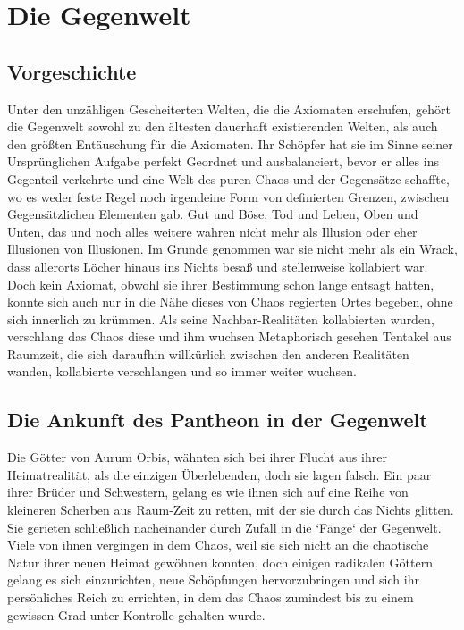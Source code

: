 \documentclass[a4paper,12pt,oneside]{book}
\begin{document}
\section{Die Gegenwelt}
\subsection{Vorgeschichte}
Unter den unzähligen Gescheiterten Welten, die die Axiomaten erschufen, gehört die Gegenwelt sowohl zu den ältesten dauerhaft existierenden Welten, als auch den größten Entäuschung für die Axiomaten. Ihr Schöpfer hat sie im Sinne seiner Ursprünglichen Aufgabe perfekt Geordnet und ausbalanciert, bevor er alles ins Gegenteil verkehrte und eine Welt des puren Chaos und der Gegensätze schaffte, wo es weder feste Regel noch irgendeine Form von definierten Grenzen, zwischen Gegensätzlichen Elementen gab. Gut und Böse, Tod und Leben, Oben und Unten, das und noch alles weitere wahren nicht mehr als Illusion oder eher Illusionen von Illusionen. Im Grunde genommen war sie nicht mehr als ein Wrack, dass allerorts Löcher hinaus ins Nichts besaß und stellenweise kollabiert war. Doch kein Axiomat, obwohl sie ihrer Bestimmung schon lange entsagt hatten, konnte sich auch nur in die Nähe dieses von Chaos regierten Ortes begeben, ohne sich innerlich zu krümmen. Als seine Nachbar-Realitäten kollabierten wurden, verschlang das Chaos diese und ihm wuchsen Metaphorisch gesehen Tentakel aus Raumzeit, die sich daraufhin willkürlich zwischen den anderen Realitäten wanden, kollabierte verschlangen und so immer weiter wuchsen.

\subsection{Die Ankunft des Pantheon in der Gegenwelt}
Die Götter von Aurum Orbis, wähnten sich bei ihrer Flucht aus ihrer Heimatrealität, als die einzigen Überlebenden, doch sie lagen falsch. Ein paar ihrer Brüder und Schwestern, gelang es wie ihnen sich auf eine Reihe von kleineren Scherben aus Raum-Zeit zu retten, mit der sie durch das Nichts glitten. Sie gerieten schließlich nacheinander durch Zufall in die `Fänge` der Gegenwelt. Viele von ihnen vergingen in dem Chaos, weil sie sich nicht an die chaotische Natur ihrer neuen Heimat gewöhnen konnten, doch einigen radikalen Göttern gelang es sich einzurichten, neue Schöpfungen hervorzubringen und sich ihr persönliches Reich zu errichten, in dem das Chaos zumindest bis zu einem gewissen Grad unter Kontrolle gehalten wurde.
\end{document}
